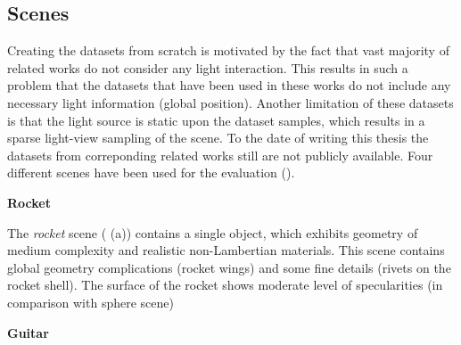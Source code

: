 





\subsection{Scenes}
\label{subsec:scenes}

Creating the datasets from scratch is motivated by the fact that
vast majority of related works do not consider any light interaction.
This results in such a problem that the datasets that have been used in these works
do not include any necessary light information (global position).
Another limitation of these datasets is that the light source is static upon the dataset samples,
which results in a sparse light-view sampling of the scene.
To the date of writing this thesis the datasets from correponding related works \cite{nerv2021}
still are not publicly available.
Four different scenes have been used for the evaluation ().






\textbf{Rocket}

The \textit{rocket} scene ( (a)) contains a single object,
which exhibits geometry of medium complexity and realistic non-Lambertian materials.
This scene contains global geometry complications (rocket wings) and some fine details (rivets on the rocket shell).
The surface of the rocket shows moderate level of specularities (in comparison with sphere scene)

\textbf{Guitar}


